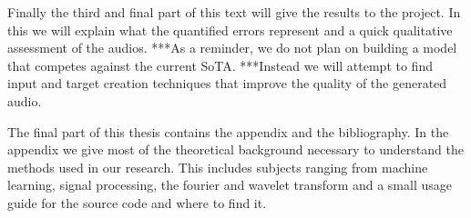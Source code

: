 \documentclass{book}
\begin{document}
\par
Finally the third and final part of this text will give the results to the project.
In this we will explain what the quantified errors represent and a quick qualitative assessment of the audios.
***As a reminder, we do not plan on building a model that competes against the current SoTA.
***Instead we will attempt to find input and target creation techniques that improve the quality of the generated audio.
\par
The final part of this thesis contains the appendix and the bibliography.
In the appendix we give most of the theoretical background necessary to understand the methods used in our research.
This includes subjects ranging from machine learning, signal processing, the fourier and wavelet transform and a small usage guide for the source code and where to find it.


\end{document}
